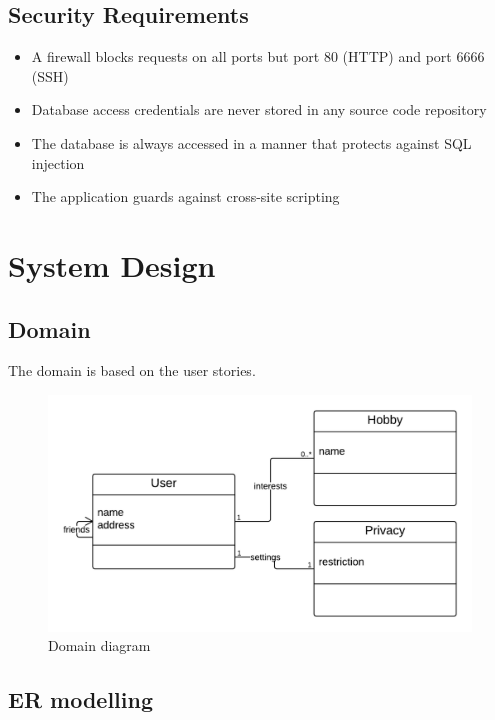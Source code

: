 \documentclass[a4paper]{article}
\begin{document}
\subsection{Security Requirements}
\begin{itemize}
\item A firewall blocks requests on all ports but port 80 (HTTP) and port 6666 (SSH)
\item Database access credentials are never stored in any source code repository
\item The database is always accessed in a manner that protects against SQL injection
\item The application guards against cross-site scripting
\end{itemize}

\section{System Design}
\subsection{Domain}
The domain is based on the user stories.


\begin{figure}[h!]
\centering
\includegraphics[scale=0.3]{Domain}
\caption{Domain diagram}
\label{fig:domain_diagram}
\end{figure}

\subsection{ER modelling}
\end{document}
